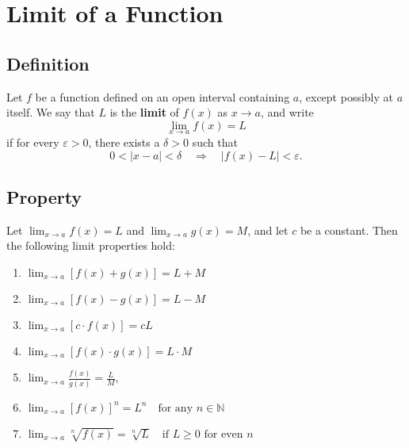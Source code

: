 \documentclass[11pt]{article}
\begin{document}
\pagestyle{plain}
\begin{center}
  \tableofcontents
\end{center}
\newpage
\setcounter{page}{1}
\pagestyle{fancy}
\section{Limit of a Function}
\subsection{Definition}
Let $f$ be a function defined on an open interval containing $a$, except possibly at $a$ itself.
We say that $L$ is the \textbf{limit} of $f(x)$ as $x \to a$, and write
\[
    \lim_{x\to a}f(x) = L\] if for every $\varepsilon > 0$, there exists a $\delta > 0$ such that
\[
  0 < |x - a| < \delta \quad \Rightarrow \quad |f(x) - L| < \varepsilon.
\]
\subsection{Property}
Let $\displaystyle\lim_{x \to a} f(x) = L$ and $\displaystyle\lim_{x \to a} g(x) = M$, and let $c$ be a constant. Then the following limit properties hold:
\begin{enumerate}
    \item $ 
        \displaystyle
        \lim_{x \to a} [f(x) + g(x)] = L + M
    $    
    \item $
        \displaystyle
        \lim_{x \to a} [f(x) - g(x)] = L - M
    $
    
    \item $
        \displaystyle
        \lim_{x \to a} [c \cdot f(x)] = cL
    $
    
    \item $
        \displaystyle
        \lim_{x \to a} [f(x) \cdot g(x)] = L \cdot M
    $
    
    \item $
        \displaystyle
        \lim_{x \to a} \frac{f(x)}{g(x)} = \frac{L}{M}
    $, 
    
    \item $
        \displaystyle
        \lim_{x \to a} [f(x)]^n = L^n \quad \text{for any } n \in \mathbb{N}
    $
    
    \item $
        \displaystyle
        \lim_{x \to a} \sqrt[n]{f(x)} = \sqrt[n]{L} \quad \text{if } L \ge 0 \text{ for even } n
    $
\end{enumerate}
\end{document}
